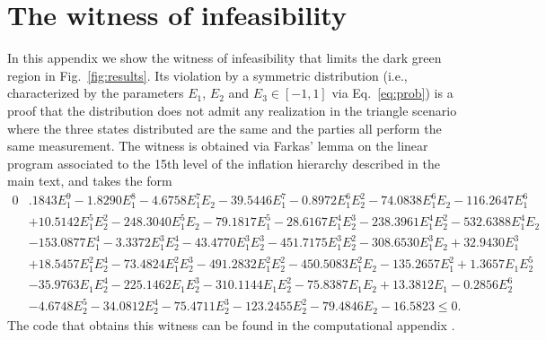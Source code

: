 \documentclass[aps,physrev,reprint,superscriptaddress,nofootinbib,twocolumn]{revtex4-2}
\begin{document}
\section{The witness of infeasibility}
\label{app:cert}
In this appendix we show the witness of infeasibility that limits the dark green region in Fig.~\ref{fig:results}.
Its violation by a symmetric distribution (i.e., characterized by the parameters $E_1$, $E_2$ and $E_3\in[-1,1]$ via Eq.~\eqref{eq:prob}) is a proof that the distribution does not admit any realization in the triangle scenario where the three states distributed are the same and the parties all perform the same measurement.
The witness is obtained via Farkas' lemma on the linear program associated to the 15th level of the inflation hierarchy described in the main text, and takes the form
\begin{equation}
    \begin{aligned}
    0&.1843 E_1^9 - 1.8290 E_1^8 - 4.6758 E_1^7 E_2 - 39.5446 E_1^7 - 0.8972 E_1^6 E_2^2 - 74.0838 E_1^6 E_2 - 116.2647 E_1^6 \\
    &+ 10.5142 E_1^5 E_2^2 - 248.3040 E_1^5 E_2 - 79.1817 E_1^5 - 28.6167 E_1^4 E_2^3 - 238.3961 E_1^4 E_2^2 - 532.6388 E_1^4 E_2 \\
    &- 153.0877 E_1^4 - 3.3372 E_1^3 E_2^4 - 43.4770 E_1^3 E_2^3 - 451.7175 E_1^3 E_2^2 - 308.6530 E_1^3 E_2 + 32.9430 E_1^3 \\
    &+ 18.5457 E_1^2 E_2^4 - 73.4824 E_1^2 E_2^3 - 491.2832 E_1^2 E_2^2 - 450.5083 E_1^2 E_2 - 135.2657 E_1^2 + 1.3657 E_1 E_2^5 \\
    &- 35.9763 E_1 E_2^4 - 225.1462 E_1 E_2^3 - 310.1144 E_1 E_2^2 - 75.8387 E_1 E_2 + 13.3812 E_1 - 0.2856 E_2^6 \\
    &- 4.6748 E_2^5 - 34.0812 E_2^4 - 75.4711 E_2^3 - 123.2455 E_2^2 - 79.4846 E_2 - 16.5823 \leq 0.
    \end{aligned}
\end{equation}
The code that obtains this witness can be found in the computational appendix \cite{compapp}.


\end{document}
